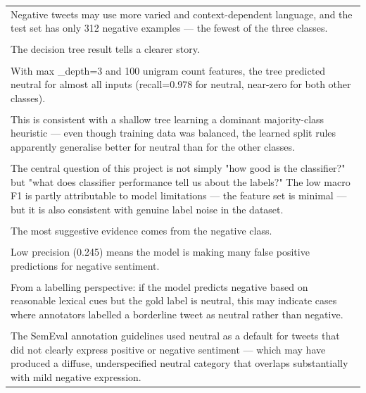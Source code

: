 \documentclass[11pt]{article}
\begin{document}
\begin{longtable}{|p{\dimexpr\linewidth-2\tabcolsep-2\arrayrulewidth\relax}|}
\hline
\rule{0pt}{3.5cm} \\
\hline
Negative tweets may use more varied and context-dependent language, and the test set has only 312 negative examples --- the fewest of the three classes. \\[2pt]
\hline
\rule{0pt}{3.5cm} \\
\hline
The decision tree result tells a clearer story. \\[2pt]
\hline
\rule{0pt}{3.5cm} \\
\hline
With max \_depth=3 and 100 unigram count features, the tree predicted neutral for almost all inputs (recall=0.978 for neutral, near-zero for both other classes). \\[2pt]
\hline
\rule{0pt}{3.5cm} \\
\hline
This is consistent with a shallow tree learning a dominant majority-class heuristic --- even though training data was balanced, the learned split rules apparently generalise better for neutral than for the other classes. \\[2pt]
\hline
\rule{0pt}{3.5cm} \\
\hline
The central question of this project is not simply "how good is the classifier?" but "what does classifier performance tell us about the labels?" The low macro F1 is partly attributable to model limitations --- the feature set is minimal --- but it is also consistent with genuine label noise in the dataset. \\[2pt]
\hline
\rule{0pt}{3.5cm} \\
\hline
The most suggestive evidence comes from the negative class. \\[2pt]
\hline
\rule{0pt}{3.5cm} \\
\hline
Low precision (0.245) means the model is making many false positive predictions for negative sentiment. \\[2pt]
\hline
\rule{0pt}{3.5cm} \\
\hline
From a labelling perspective: if the model predicts negative based on reasonable lexical cues but the gold label is neutral, this may indicate cases where annotators labelled a borderline tweet as neutral rather than negative. \\[2pt]
\hline
\rule{0pt}{3.5cm} \\
\hline
The SemEval annotation guidelines used neutral as a default for tweets that did not clearly express positive or negative sentiment --- which may have produced a diffuse, underspecified neutral category that overlaps substantially with mild negative expression. \\[2pt]

\end{longtable}
\end{document}
